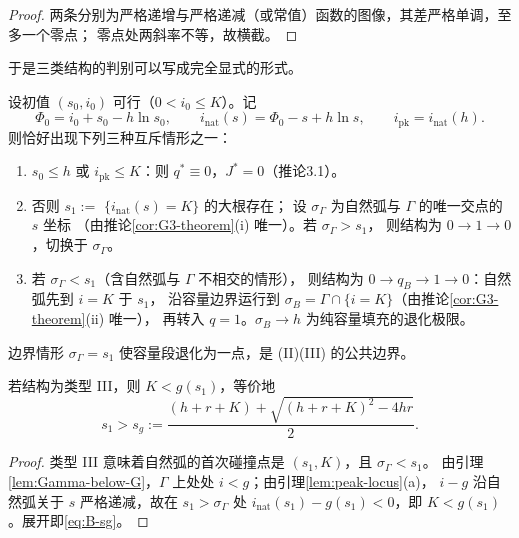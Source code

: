 \begin{proof}
两条分别为严格递增与严格递减（或常值）函数的图像，其差严格单调，至多一个零点；
零点处两斜率不等，故横截。
\end{proof}

于是三类结构的判别可以写成完全显式的形式。

\begin{proposition}[三类结构的穷尽性与判据]
\label{prop:exhaustive}
设初值 $(s_0,i_0)$ 可行（$0<i_0\le K$）。记
\[
  \Phi_0=i_0+s_0-h\ln s_0,\qquad
  i_{\mathrm{nat}}(s)=\Phi_0-s+h\ln s,\qquad
  i_{\mathrm{pk}}=i_{\mathrm{nat}}(h).
\]
则恰好出现下列三种互斥情形之一：
\begin{enumerate}
\item[(I)] $s_0\le h$ 或 $i_{\mathrm{pk}}\le K$：则 $q^*\equiv0$，$J^*=0$（推论3.1）。
\item[(II)] 否则 $s_1:=$ $\{i_{\mathrm{nat}}(s)=K\}$ 的大根存在；
      设 $\sigma_\Gamma$ 为自然弧与 $\Gamma$ 的唯一交点的 $s$ 坐标
      （由推论\ref{cor:G3-theorem}(i) 唯一）。若 $\sigma_\Gamma>s_1$，
      则结构为 $0\to1\to0$，切换于 $\sigma_\Gamma$。
\item[(III)] 若 $\sigma_\Gamma<s_1$（含自然弧与 $\Gamma$ 不相交的情形），
      则结构为 $0\to q_B\to1\to0$：自然弧先到 $i=K$ 于 $s_1$，
      沿容量边界运行到 $\sigma_B=\Gamma\cap\{i=K\}$（由推论\ref{cor:G3-theorem}(ii) 唯一），
      再转入 $q=1$。$\sigma_B\to h$ 为纯容量填充的退化极限。
\end{enumerate}
边界情形 $\sigma_\Gamma=s_1$ 使容量段退化为一点，是 (II)(III) 的公共边界。
\end{proposition}

\begin{corollary}
\label{cor:typeIII-necessary}
若结构为类型 III，则 $K<g(s_1)$，等价地
\begin{equation}
  s_1>s_g:=\frac{(h+r+K)+\sqrt{(h+r+K)^2-4hr}}{2}.
  \label{eq:B-sg}
\end{equation}
\end{corollary}

\begin{proof}
类型 III 意味着自然弧的首次碰撞点是 $(s_1,K)$，且 $\sigma_\Gamma<s_1$。
由引理\ref{lem:Gamma-below-G}，$\Gamma$ 上处处 $i<g$；由引理\ref{lem:peak-locus}(a)，
$i-g$ 沿自然弧关于 $s$ 严格递减，故在 $s_1>\sigma_\Gamma$ 处
$i_{\mathrm{nat}}(s_1)-g(s_1)<0$，即 $K<g(s_1)$。展开即\eqref{eq:B-sg}。
\end{proof}

